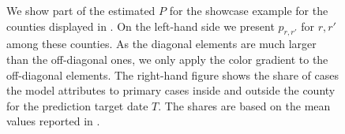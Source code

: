 \begin{figure}
   \resizebox{\textwidth}{!}{%
        
}
    \caption{We show part of the estimated $P$ for the showcase example for the counties displayed in . On the left-hand side we present $p_{r,r'}$ for $r,r'$ among these counties. As the diagonal elements are much larger than the off-diagonal ones, we only apply the color gradient to the off-diagonal elements. The right-hand figure shows the share of cases the model attributes to primary cases inside and outside the county for the prediction target date $T$. The shares are based on the mean values reported in .}
    \label{fig:P_matrix_GL_neighbors}
\end{figure}
